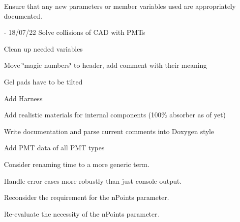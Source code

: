 \begin{DoxyRefList}
Ensure that any new parameters or member variables used are appropriately documented.  
\item[File \mbox{\hyperlink{_o_m_sim_l_o_m18_8cc}{OMSim\+LOM18.cc}} ]\label{todo__todo000006}%
%
-\/ 18/07/22 Solve collisions of CAD with PMTs
\begin{DoxyItemize}
\item Clean up needed variables
\item Move \char`\"{}magic numbers\char`\"{} to header, add comment with their meaning
\item Gel pads have to be tilted
\item Add Harness
\item Add realistic materials for internal components (100\% absorber as of yet)
\item Write documentation and parse current comments into Doxygen style  
\end{DoxyItemize}
\item[Member \mbox{\hyperlink{class_o_m_sim_p_m_t_response_a0dd544847ff216a24aa8c528e76c9aed}{OMSim\+PMTResponse\+::create\+Histogram\+From\+Data}} (const std\+::string \&p\+File\+Path, const char $\ast$p\+TH2\+DName)]\label{todo__todo000002}%
%
Add PMT data of all PMT types  
\item[Member \mbox{\hyperlink{class_o_m_sim_s_n_tools_aa760cb3204e636696ce5be962409694e}{OMSim\+SNTools\+::findtime}} (G4double time, std\+::vector$<$ G4double $>$ timearray)]\label{todo__todo000014}%
%
Consider renaming \textquotesingle{}time\textquotesingle{} to a more generic term.  
\item[Member \mbox{\hyperlink{class_o_m_sim_s_n_tools_a89a22f20d0aff91704cf6cab1b48d266}{OMSim\+SNTools\+::get\+File\+Names}} (int value)]\label{todo__todo000011}%
%
Handle error cases more robustly than just console output.  
\item[Member \mbox{\hyperlink{class_o_m_sim_s_n_tools_acd2197f87f712d54eff8e93b233e8478}{OMSim\+SNTools\+::Inverse\+Cumul}} (std\+::vector$<$ G4double $>$ xvals, std\+::vector$<$ G4double $>$ yvals, G4int n\+Points)]\label{todo__todo000012}%
%
Reconsider the requirement for the \textquotesingle{}n\+Points\textquotesingle{} parameter.  
\item[Member \mbox{\hyperlink{class_o_m_sim_s_n_tools_a296fba8cceca9892ab52ac9e18064b01}{OMSim\+SNTools\+::Inverse\+Cumul\+Algorithm}} (std\+::vector$<$ G4double $>$ x, std\+::vector$<$ G4double $>$ f, std\+::vector$<$ G4double $>$ a, std\+::vector$<$ G4double $>$ Fc, G4int n\+Points)]\label{todo__todo000013}%
%
Re-\/evaluate the necessity of the \textquotesingle{}n\+Points\textquotesingle{} parameter. 
\end{DoxyRefList}
